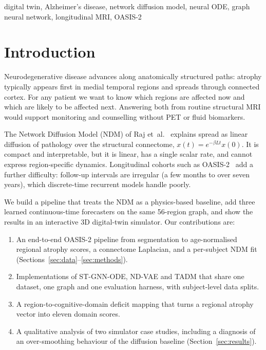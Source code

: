\documentclass[conference]{IEEEtran}
\begin{document}
\begin{IEEEkeywords}
digital twin, Alzheimer's disease, network diffusion model, neural ODE, graph neural network, longitudinal MRI, OASIS-2
\end{IEEEkeywords}

\section{Introduction}
Neurodegenerative disease advances along anatomically structured paths: atrophy typically appears first in medial temporal regions and spreads through connected cortex. For any patient we want to know which regions are affected now and which are likely to be affected next. Answering both from routine structural MRI would support monitoring and counselling without PET or fluid biomarkers.

The Network Diffusion Model (NDM) of Raj et~al.~\cite{raj2012ndm,raj2015ndm} explains spread as linear diffusion of pathology over the structural connectome, $x(t)=e^{-\beta Lt}x(0)$. It is compact and interpretable, but it is linear, has a single scalar rate, and cannot express region-specific dynamics. Longitudinal cohorts such as OASIS-2~\cite{marcus2010oasis} add a further difficulty: follow-up intervals are irregular (a few months to over seven years), which discrete-time recurrent models handle poorly.

We build a pipeline that treats the NDM as a physics-based baseline, add three learned continuous-time forecasters on the same 56-region graph, and show the results in an interactive 3D digital-twin simulator. Our contributions are:
\begin{enumerate}
\item An end-to-end OASIS-2 pipeline from segmentation to age-normalised regional atrophy scores, a connectome Laplacian, and a per-subject NDM fit (Sections~\ref{sec:data}--\ref{sec:methods}).
\item Implementations of ST-GNN-ODE, ND-VAE and TADM that share one dataset, one graph and one evaluation harness, with subject-level data splits.
\item A region-to-cognitive-domain deficit mapping that turns a regional atrophy vector into eleven domain scores.
\item A qualitative analysis of two simulator case studies, including a diagnosis of an over-smoothing behaviour of the diffusion baseline (Section~\ref{sec:results}).
\end{enumerate}
\end{document}
